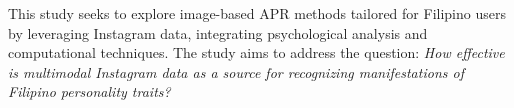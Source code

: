 

This study seeks to explore image-based APR methods tailored for Filipino users by leveraging Instagram data, integrating psychological analysis and computational techniques. The study aims to address the question: \textit{How effective is multimodal Instagram data as a source for recognizing manifestations of Filipino personality traits?}







